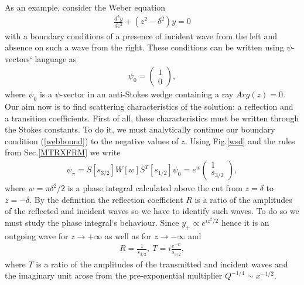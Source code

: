 \documentclass[aps,prl,preprint,superscriptaddress]{revtex4}
\begin{document}
As an example, consider the Weber equation
\begin{eqnarray}
\frac{d^2 y}{dz^2}+(z^2-\delta^2)y=0
\label{webeq}
\end{eqnarray}
with a boundary conditions of a presence of incident wave from the left and absence on such a wave from the right. These conditions can be written using $\psi$-vectors` language as
\begin{eqnarray}
\psi_0= \begin{pmatrix} 1 \\ 0 \end{pmatrix},
\label{webbound}
\end{eqnarray}
where $\psi_0$ is a $\psi$-vector in an anti-Stokes wedge containing a ray $Arg(z)=0$. Our aim now is to find scattering characteristics of the solution: a reflection and a transition coefficients. First of all, these characteristics must be written through the Stokes constants. To do it, we must analytically continue our boundary condition (\ref{webbound}) 
to the negative values of $z$. Using Fig.\ref{wsd} and the rules from Sec.\ref{MTRXFRM} we write
\begin{eqnarray}
\psi_{\pi} = S[s_{3/2}]W[w]S^T[s_{1/2}]\psi_0 = e^w\begin{pmatrix} 1 \\ s_{3/2} \end{pmatrix},
\label{wpac}
\end{eqnarray}
where $w=\pi\delta^2/2$ is a phase integral calculated above the cut from $z=\delta$ to $z=-\delta$. By the definition the reflection coefficient $R$ is a ratio of the amplitudes of the reflected and incident waves so we have to identify such waves. To do so we must study the phase integral`s behaviour. Since $y_+ \propto e^{i z^2/2}$ hence it is an outgoing wave for $z \rightarrow +\infty$ as well as for $z \rightarrow -\infty$ and
\begin{eqnarray}
R = \frac{1}{s_{3/2}},\ T=i\frac{e^{-w}}{s_{3/2}},
\label{rt}
\end{eqnarray}
where $T$ is a ratio of the amplitudes of the transmitted and incident waves and the imaginary unit arose from the pre-exponential multiplier $Q^{-1/4} \sim x^{-1/2}$.
\end{document}

